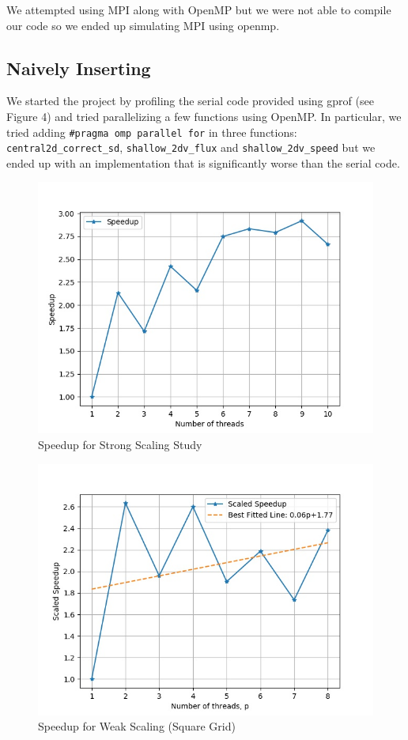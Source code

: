 \documentclass{article}
\begin{document}
We attempted using MPI along with OpenMP but we were not able to compile our code so we ended up simulating MPI using openmp. 

\subsection{Naively Inserting }

We started the project by profiling the serial code provided using gprof (see Figure 4) and tried parallelizing a few functions using OpenMP. In particular, we tried adding \texttt{\#pragma omp parallel for} in three functions: \texttt{central2d\_correct\_sd}, \texttt{shallow\_2dv\_flux} and \texttt{shallow\_2dv\_speed} but we ended up with an implementation that is significantly worse than the serial code.

\begin{figure}[h!]
	\centering
	\includegraphics[width=0.8\columnwidth]{../strong_scaling.jpg}
	\caption{Speedup for Strong Scaling Study}
	\label{fig:strong_scaling}
\end{figure}

\begin{figure}[h!]
	\centering
	\includegraphics[width=0.8\columnwidth]{../weak_scaling.jpg}
	\caption{Speedup for Weak Scaling (Square Grid)}
	\label{fig:weak_scaling}
\end{figure}
\end{document}
